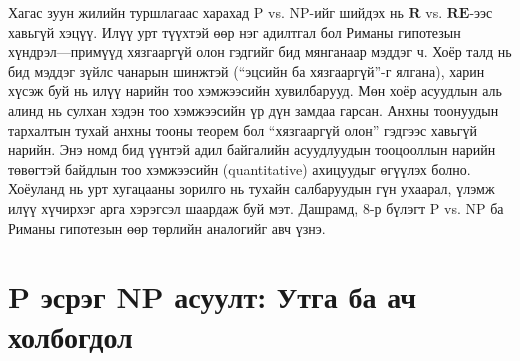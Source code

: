 Хагас зуун жилийн туршлагаас харахад P vs. NP-ийг шийдэх нь $\mathbf{R}$ vs. $\mathbf{RE}$-ээс хавьгүй хэцүү. Илүү урт түүхтэй өөр нэг адилтгал бол Риманы гипотезын хүндрэл—примүүд хязгааргүй олон гэдгийг бид мянганаар мэддэг ч. Хоёр талд нь бид мэддэг зүйлс чанарын шинжтэй (“эцсийн ба хязгааргүй”-г ялгана), харин хүсэж буй нь илүү нарийн тоо хэмжээсийн хувилбарууд. Мөн хоёр асуудлын аль алинд нь сулхан хэдэн тоо хэмжээсийн үр дүн замдаа гарсан. Анхны тоонуудын тархалтын тухай анхны тооны теорем бол “хязгааргүй олон” гэдгээс хавьгүй нарийн. Энэ номд бид үүнтэй адил байгалийн асуудлуудын тооцооллын нарийн төвөгтэй байдлын тоо хэмжээсийн (quantitative) ахицуудыг өгүүлэх болно. Хоёуланд нь урт хугацааны зорилго нь тухайн салбаруудын гүн ухаарал, үлэмж илүү хүчирхэг арга хэрэгсэл шаардаж буй мэт. Дашрамд, 8-р бүлэгт P vs. NP ба Риманы гипотезын өөр төрлийн аналогийг авч үзнэ.


\section{$\mathbf{P}$ эсрэг $\mathbf{NP}$ асуулт: Утга ба ач холбогдол}




